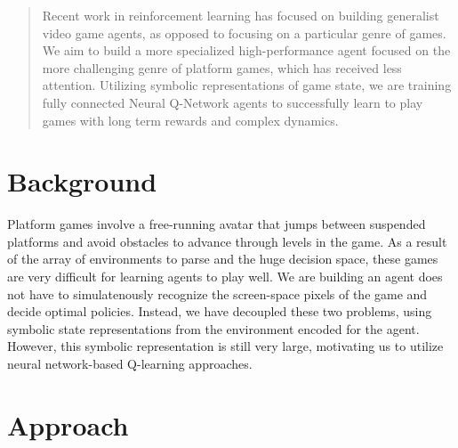 \documentclass{article}
\begin{document}
 


\begin{abstract} 
Recent work in reinforcement learning has focused on building generalist video game agents, as opposed to focusing on a particular genre of games. We aim to build a more specialized high-performance agent focused on the more challenging genre of platform games, which has received less attention. Utilizing symbolic representations of game state, we are training fully connected Neural Q-Network agents to successfully learn to play games with long term rewards and complex dynamics.
\end{abstract} 



\section{Background}
Platform games involve a free-running avatar that jumps between suspended platforms and avoid obstacles to advance through levels in the game. As a result of the array of environments to parse and the huge decision space, these games are very difficult for learning agents to play well. We are building an agent does not have to simulatenously recognize the screen-space pixels of the game and decide optimal policies. Instead, we have decoupled these two problems, using symbolic state representations from the environment encoded for the agent. However, this symbolic representation is still very large, motivating us to utilize neural network-based Q-learning approaches. 

\section{Approach}
\end{document}
